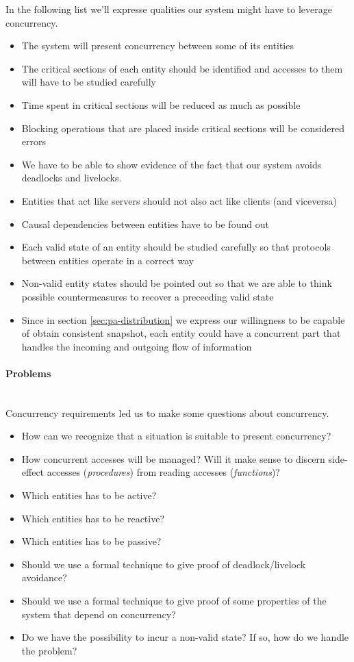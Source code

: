 In the following list we'll expresse qualities our system might have to
leverage concurrency.

\begin{itemize}
\item The system will present concurrency between some of its entities
\item The critical sections of each entity should be identified and accesses to
  them will have to be studied carefully
\item Time spent in critical sections will be reduced as much as possible
\item Blocking operations that are placed inside critical sections will be
  considered errors
\item We have to be able to show evidence of the fact that our system avoids
  deadlocks and livelocks.
\item Entities that act like servers should not also act like clients (and
  viceversa)
\item Causal dependencies between entities have to be found out
\item Each valid state of an entity should be studied carefully so that
  protocols between entities operate in a correct way
\item Non-valid entity states should be pointed out so that we are able to
  think possible countermeasures to recover a preceeding valid state
\item Since in section \ref{sec:pa-distribution} we express our willingness to
  be capable of obtain consistent snapshot, each entity could have a concurrent
  part that handles the incoming and outgoing flow of information
\end{itemize}

\paragraph{Problems} \mbox{} \\

Concurrency requirements led us to make some questions about concurrency.

\begin{itemize}
\item How can we recognize that a situation is suitable to present concurrency?
\item How concurrent accesses will be managed? Will it make sense to discern
  side-effect accesses (\emph{procedures}) from reading accesses
  (\emph{functions})?
\item Which entities has to be active?
\item Which entities has to be reactive?
\item Which entities has to be passive?
\item Should we use a formal technique to give proof of deadlock/livelock
  avoidance?
\item Should we use a formal technique to give proof of some properties of the
  system that depend on concurrency?
\item Do we have the possibility to incur a non-valid state? If so, how do we
  handle the problem?
\end{itemize}


